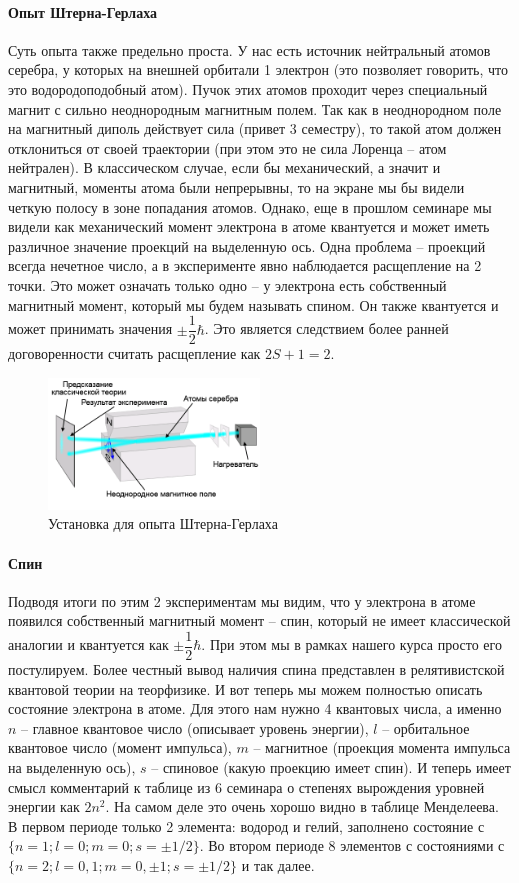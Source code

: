 \documentclass[12pt]{article}
\begin{document}
\paragraph{Опыт Штерна-Герлаха}
Суть опыта также предельно проста. У нас есть источник нейтральный атомов серебра, у которых на внешней орбитали 1 электрон (это позволяет говорить, что это водородоподобный атом). Пучок этих атомов проходит через специальный магнит с сильно неоднородным магнитным полем. Так как в неоднородном поле на магнитный диполь действует сила (привет 3 семестру), то такой атом должен отклониться от своей траектории (при этом это не сила Лоренца -- атом нейтрален). В классическом случае, если бы механический, а значит и магнитный, моменты атома были непрерывны, то на экране мы бы видели четкую полосу в зоне попадания атомов. Однако, еще в прошлом семинаре мы видели как механический момент электрона в атоме квантуется и может иметь различное значение проекций на выделенную ось. Одна проблема -- проекций всегда нечетное число, а в эксперименте явно наблюдается расщепление на 2 точки. Это может означать только одно -- у электрона есть собственный магнитный момент, который мы будем называть спином. Он также квантуется и может принимать значения $\pm \dfrac{1}{2}\hbar$. Это является следствием более ранней договоренности считать расщепление как $2S+1=2$. 
\begin{figure}[h]
    \centering
    \includegraphics[width=0.5\textwidth,height=\textheight,keepaspectratio]{Seminar_07/pics/pic_02.png}
    \caption{Установка для опыта Штерна-Герлаха}
    \label{fig:sem_7_gymagnetic_ratio}
\end{figure}
\paragraph{Спин} Подводя итоги по этим 2 экспериментам мы видим, что у электрона в атоме появился собственный магнитный момент -- спин, который не имеет классической аналогии и квантуется как $\pm \dfrac{1}{2}\hbar$. При этом мы в рамках нашего курса просто его постулируем. Более честный вывод наличия спина представлен в релятивистской квантовой теории на теорфизике. 
И вот теперь мы можем полностью описать состояние электрона в атоме. Для этого нам нужно 4 квантовых числа, а именно $n$ -- главное квантовое число (описывает уровень энергии), $l$ -- орбитальное квантовое число (момент импульса), $m$ -- магнитное (проекция момента импульса на выделенную ось), $s$ -- спиновое (какую проекцию имеет спин). И теперь имеет смысл комментарий к таблице из 6 семинара о степенях вырождения уровней энергии как $2n^2$. На самом деле это очень хорошо видно в таблице Менделеева. В первом периоде только 2 элемента: водород и гелий, заполнено состояние с $\{n = 1; l=0; m=0; s=\pm1/2\}$. Во втором периоде 8 элементов с состояниями с $\{n = 2; l=0,1; m=0,\pm1; s=\pm1/2\}$ и так далее. 
\end{document}
